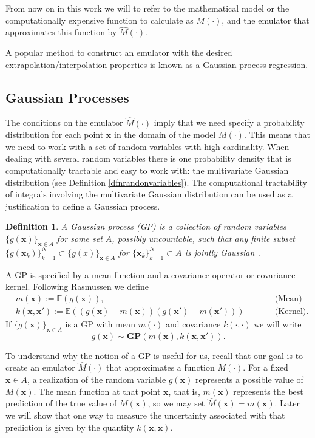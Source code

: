 \documentclass{sfuthesis}
\newtheorem{definition}{Definition}
\newcommand{\E}{\mathbb{E}} %
\newcommand{\x}{\textbf{x}}
\begin{document}
From now on in this work we will  to refer to the mathematical model or the computationally expensive
function to calculate as $M(\cdot)$, and the emulator that approximates this function  by 
$\widehat{M}(\cdot)$.

A  popular  method to construct an emulator with the desired
extrapolation/interpolation properties is  known as a Gaussian process regression.  

\subsection{Gaussian Processes}\label{secGPs}
The conditions on the emulator $\widehat{M}(\cdot)$ imply that we need
specify a probability distribution for each point $\textbf{x}$ in the domain of the model $M(\cdot)$.
This means that  we need to work with  a set of random variables 
with high cardinality. 
When dealing with 
several random variables there is one probability density that is computationally tractable and
easy to work with: the multivariate Gaussian distribution (see Definition \ref{dfnrandonvariables}). 
The computational tractability  of integrals involving the multivariate Gaussian distribution can be used as a justification
to define a Gaussian process.
\begin{definition}\label{dfnGP}
A Gaussian process (GP) is a collection of random variables $\{g(\x)\}_{\x\in A}$ for some set $A$, 
possibly uncountable,
 such that any finite subset
 $\{g(\x_{k})\}_{k=1}^{N}\subset\{g(x)\}_{\x\in A}$ for 
$\{\x_{k}\}_{k=1}^{N}\subset A$ is jointly Gaussian
\cite{rasmussen2006gaussian}. 
\end{definition}

A GP is specified by a mean function and a covariance operator or covariance kernel. 
Following  Rasmussen \cite{rasmussen2006gaussian} we define
\begin{align*}
& m(\x):=\E(g(\x)),&&\qquad\text{(Mean)}\\
& k(\x,\x'):=\E((g(\x)-m(\x))(g(\x')-m(\x')))&&\qquad\text{(Kernel)}.
\end{align*}
If $\{g(\x)\}_{\x\in A}$ is a GP with mean $m(\cdot)$ and covariance $k(\cdot,\cdot)$ we will write
\begin{equation*}
g(\x)\sim \textbf{GP}(m(\x),k(\x,\x')).
\end{equation*} 

To  understand why the notion of a GP is useful for us, recall that our goal is to create
an emulator $\widehat{M}(\cdot)$ that approximates a function $M(\cdot)$. 
For a fixed $\x\in A$, a realization of the  random variable $g(\x)$ represents
a possible value of $M(\x)$. The mean function at that point $\x$, that is, $m(\x)$ 
represents the best prediction of the true value of $M(\x)$, so we may set
$\widehat{M}(\x)=m(\x)$. Later we will show that one way to measure the  uncertainty 
associated with that prediction is given by the quantity $k(\x,\x)$.
\end{document}
